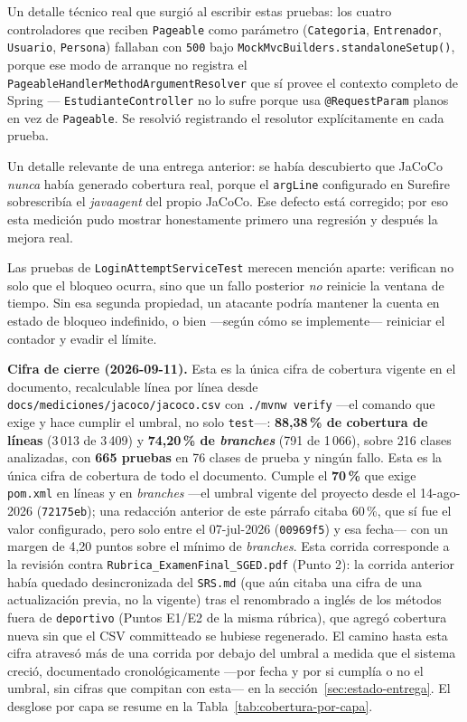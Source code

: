 \documentclass[11pt,a4paper]{article}
\newcommand{\ruta}[1]{\texttt{\footnotesize #1}}
\begin{document}
Un detalle técnico real que surgió al escribir estas pruebas: los cuatro
controladores que reciben \texttt{Pageable} como parámetro
(\texttt{Categoria}, \texttt{Entrenador}, \texttt{Usuario}, \texttt{Persona})
fallaban con \texttt{500} bajo \texttt{MockMvcBuilders.standaloneSetup()},
porque ese modo de arranque no registra el
\texttt{PageableHandlerMethodArgumentResolver} que sí provee el contexto
completo de Spring — \texttt{EstudianteController} no lo sufre porque usa
\texttt{@RequestParam} planos en vez de \texttt{Pageable}. Se resolvió
registrando el resolutor explícitamente en cada prueba.

Un detalle relevante de una entrega anterior: se había descubierto que
JaCoCo \emph{nunca} había generado cobertura real, porque el
\texttt{argLine} configurado en Surefire sobrescribía el \emph{javaagent}
del propio JaCoCo. Ese defecto está corregido; por eso esta medición pudo
mostrar honestamente primero una regresión y después la mejora real.

Las pruebas de \texttt{LoginAttemptServiceTest} merecen mención aparte:
verifican no solo que el bloqueo ocurra, sino que un fallo posterior
\emph{no} reinicie la ventana de tiempo. Sin esa segunda propiedad, un
atacante podría mantener la cuenta en estado de bloqueo indefinido, o bien
—según cómo se implemente— reiniciar el contador y evadir el límite.

\textbf{Cifra de cierre (2026-09-11).} Esta es la única cifra de
cobertura vigente en el documento, recalculable línea por línea desde
\ruta{docs/mediciones/jacoco/jacoco.csv} con
\texttt{./mvnw verify} —el comando que exige y hace cumplir el umbral,
no solo \texttt{test}—:
\textbf{88,38\,\% de cobertura de líneas} (3\,013 de 3\,409) y
\textbf{74,20\,\% de \emph{branches}} (791 de 1\,066), sobre 216 clases
analizadas, con \textbf{665 pruebas} en 76 clases de prueba y ningún
fallo. Esta es la única cifra de cobertura de todo el documento. Cumple
el \textbf{70\,\%} que exige \texttt{pom.xml} en líneas y en
\emph{branches} —el umbral vigente del proyecto desde el
14-ago-2026 (\texttt{72175eb}); una redacción anterior de este párrafo
citaba 60\,\%, que sí fue el valor configurado, pero solo entre el
07-jul-2026 (\texttt{00969f5}) y esa fecha— con un margen de 4,20 puntos
sobre el mínimo de \emph{branches}. Esta corrida
corresponde a la revisión contra \texttt{Rubrica\_ExamenFinal\_SGED.pdf}
(Punto 2): la corrida anterior había quedado desincronizada del
\texttt{SRS.md} (que aún citaba una cifra de una actualización previa,
no la vigente) tras el renombrado a inglés de los métodos fuera de
\texttt{deportivo} (Puntos E1/E2 de la misma rúbrica), que agregó
cobertura nueva sin que el CSV committeado se hubiese regenerado. El
camino hasta esta cifra atravesó más de una corrida por debajo del
umbral a medida que el sistema creció, documentado cronológicamente
—por fecha y por si cumplía o no el umbral, sin cifras que compitan con
esta— en la sección~\ref{sec:estado-entrega}. El desglose por capa se
resume en la Tabla~\ref{tab:cobertura-por-capa}.
\end{document}

